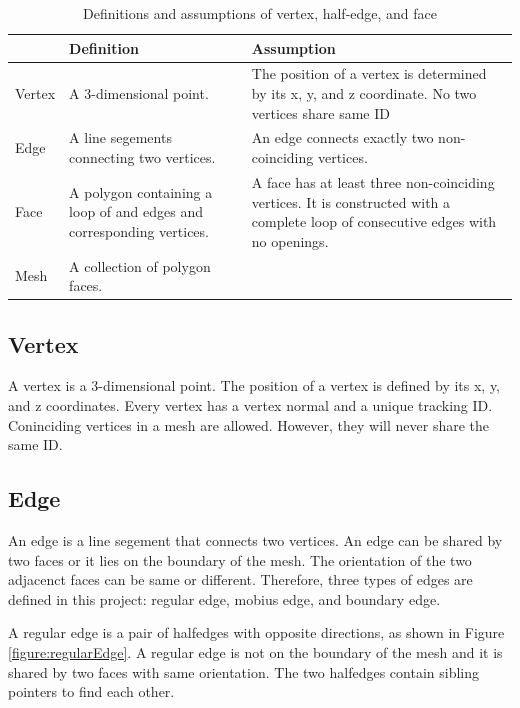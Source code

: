 \documentclass[12pt]{article}
\begin{document}
\begin{table}[h]
\centering
\begin{tabular}{| l | p{} | p{}|}

\hline
    & Definition  & Assumption  \\
\hline
Vertex  & A 3-dimensional point. & The position of a vertex is determined by its x, y, and z coordinate. No two vertices share same ID\\
\hline
Edge  & A line segements connecting two vertices. & An edge connects exactly two non-coinciding vertices.\\
\hline
Face  & A polygon containing a loop of and edges and corresponding vertices. & A face has at least three non-coinciding vertices. It is constructed with a complete loop of consecutive edges with no openings.\\
\hline
Mesh & A collection of polygon faces. &\\
\hline
\end{tabular}
\caption{Definitions and assumptions of vertex, half-edge, and face} 
\label{table:vhfdef}
\end{table}

\subsection{Vertex}

A vertex is a 3-dimensional point. The position of a vertex is defined by its x, y, and z coordinates. Every vertex has a vertex normal and a unique tracking ID. Coninciding vertices in a mesh are allowed. However, they will never share the same ID.

\subsection{Edge} \label{section:edge}

An edge is a line segement that connects two vertices. An edge can be shared by two faces or it lies on the boundary of the mesh. The orientation of the two adjacenct faces can be same or different. Therefore, three types of edges are defined in this project: regular edge, mobius edge, and boundary edge. 

A regular edge is a pair of halfedges with opposite directions, as shown in Figure \ref{figure:regularEdge}. A regular edge is not on the boundary of the mesh and it is shared by two faces with same orientation. The two halfedges contain sibling pointers to find each other.
\end{document}
